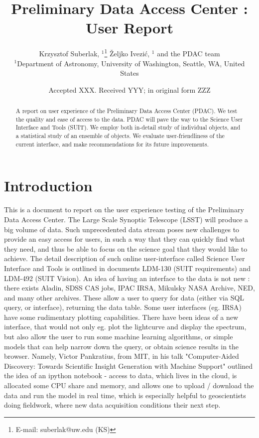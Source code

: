 \documentclass[fleqn,usenatbib]{mnras} %
\title[PDAC report]{Preliminary Data Access Center : User Report}
\author[K. Suberlak et al. ]{
Krzysztof Suberlak, $^{1}$\thanks{E-mail: suberlak@uw.edu (KS)}
\v{Z}eljko Ivezi\'c, $^{1}$ and the PDAC team  
\\
$^{1}$Department of Astronomy, University of Washington, Seattle, WA, United States\\
}
\date{Accepted XXX. Received YYY; in original form ZZZ}
\begin{document}
\label{firstpage}
\pagerange{\pageref{firstpage}--\pageref{lastpage}}
\maketitle

\begin{abstract}
A report on user experience of  the Preliminary Data Access Center (PDAC). We test the quality and ease of access to the data. PDAC will pave the way to the Science User Interface and Tools  (SUIT).   We employ both in-detail study of individual objects, and a statistical study of an ensemble of objects. We evaluate user-friendliness of the current interface, and make recommendations for  its future improvements. 
\end{abstract}




\section{Introduction}

This is a document to report on the user experience testing of the Preliminary Data Access Center.  The Large Scale Synoptic Telescope      (LSST)  will  produce a big volume of data. Such unprecedented data stream poses new challenges  to provide an easy access for users, in such a way that they can quickly find what they need, and thus be able to focus on the science goal that they would like to achieve.  The detail description of  such online user-interface called Science User Interface and Tools is outlined in documents LDM-130 (SUIT requirements)  and LDM-492  (SUIT Vision).  
An idea of having an interface to the data is not new : there exists Aladin,  SDSS CAS jobs,  IPAC  IRSA,  Mikulsky NASA Archive, NED, and many other archives. These allow a user to query for data (either via SQL query, or interface), returning the data table. Some user interfaces (eg. IRSA) have some rudimentary plotting capabilities.  There have been ideas of a new  interface, that would not only eg. plot the lightcurve and display the spectrum,  but also allow the user to run some machine learning algorithms, or simple models that can help narrow down the query, or obtain science results in the browser.  Namely, Victor Pankratius, from MIT, in his talk   "Computer-Aided Discovery: Towards Scientific Insight Generation with Machine Support"  outlined the idea of an ipython notebook - access to data, which lives in the cloud, is allocated some CPU  share and memory,  and allows one to upload / download the data and run the model in real time, which is especially helpful to geoscientists doing fieldwork, where new data acquisition conditions their next step.  
\end{document}
